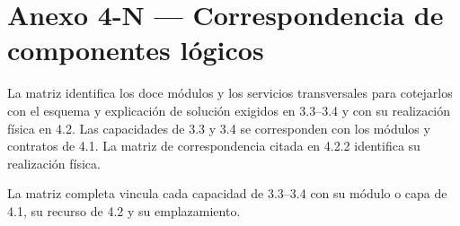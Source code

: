 \section*{Anexo 4-N — Correspondencia de componentes lógicos}
\label{fuente-15-anexo-4-1-n-correspondencia-de-componentes-logicos}
\label{anx:N}
La matriz identifica los doce módulos y los servicios transversales para cotejarlos con el esquema y explicación de solución exigidos en 3.3--3.4 y con su realización física en 4.2. Las capacidades de 3.3 y 3.4 se corresponden con los módulos y contratos de 4.1. La matriz de correspondencia citada en 4.2.2 identifica su realización física.

La matriz completa vincula cada capacidad de 3.3–3.4 con su módulo o capa de 4.1, su recurso de 4.2 y su emplazamiento.


